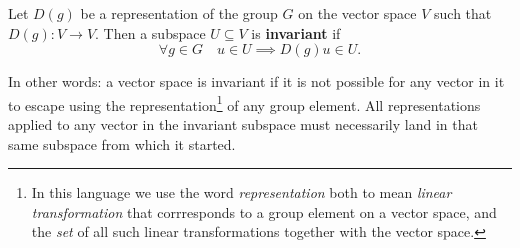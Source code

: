 \begin{defi}
    Let $D(g)$ be a representation of the group $G$ on the vector space $V$ such that $D(g)\colon V\rightarrow V$. Then
    a subspace $U\subseteq V$ is \textbf{invariant} if 
    \begin{equation}
        \label{eq:Group:Irr:invariantDef}
        \forall g\in G\quad u\in U \implies D(g)u\in U.
    \end{equation}
\end{defi}
In other words: a vector space is invariant if it is not possible for any vector in it to escape using the representation\footnote{In this language we
use the word \emph{representation} both to mean \emph{linear transformation} that corrresponds to a group element on a vector space, and the \emph{set} of all such linear
transformations together with the vector space.}
 of any group element.
All representations applied to any vector in the invariant subspace must necessarily land in that same subspace from which it started.


